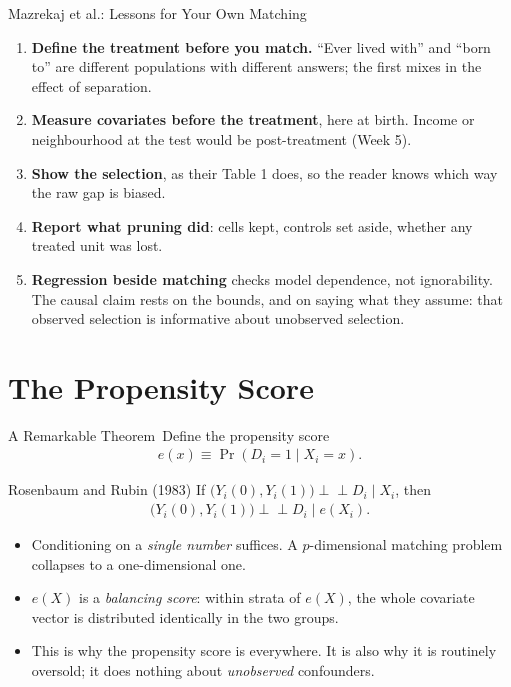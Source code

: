 \documentclass[aspectratio=169,11pt,xcolor=dvipsnames]{beamer}
\newcommand{\indep}{\perp\!\!\!\perp}
\newcommand{\core}{\,\raisebox{0.6pt}{\textcolor{corestar}{$\bigstar$}}}
\begin{document}
\begin{frame}{Mazrekaj et al.: Lessons for Your Own Matching}
\begin{enumerate}\itemsep4pt
  \item \textbf{Define the treatment before you match.} ``Ever lived with''
        and ``born to'' are different populations with different answers;
        the first mixes in the effect of separation.
  \item \textbf{Measure covariates before the treatment}, here at birth. Income
        or neighbourhood at the test would be post-treatment (Week 5).
  \item \textbf{Show the selection}, as their Table 1 does, so the reader
        knows which way the raw gap is biased.
  \item \textbf{Report what pruning did}: cells kept, controls set aside,
        whether any treated unit was lost.
  \item \textbf{Regression beside matching} checks model dependence, not
        ignorability. The causal claim rests on the bounds, and on saying
        what they assume: that observed selection is informative about
        unobserved selection.
\end{enumerate}
\end{frame}



\section[Propensity Score]{The Propensity Score}
\begin{frame}\sectionpage\end{frame}

\begin{frame}{A Remarkable Theorem\core}
Define the \alert{propensity score}
\begin{align*}
  e(x) \equiv \Pr(D_i = 1 \mid X_i = x) .
\end{align*}
\begin{block}{Rosenbaum and Rubin (1983)}
If $\big(Y_i(0),Y_i(1)\big)\indep D_i \mid X_i$, then
\begin{align*}
  \big(Y_i(0),Y_i(1)\big)\indep D_i \mid e(X_i) .
\end{align*}
\end{block}
\vskip2pt
\begin{itemize}\itemsep2pt
  \item Conditioning on a \emph{single number} suffices. A $p$-dimensional
        matching problem collapses to a one-dimensional one.
  \item $e(X)$ is a \emph{balancing score}: within strata of $e(X)$, the whole
        covariate vector is distributed identically in the two groups.
  \item This is why the propensity score is everywhere. It is also why it is
        routinely oversold; it does nothing about \emph{unobserved}
        confounders.
\end{itemize}
\end{frame}
\end{document}

